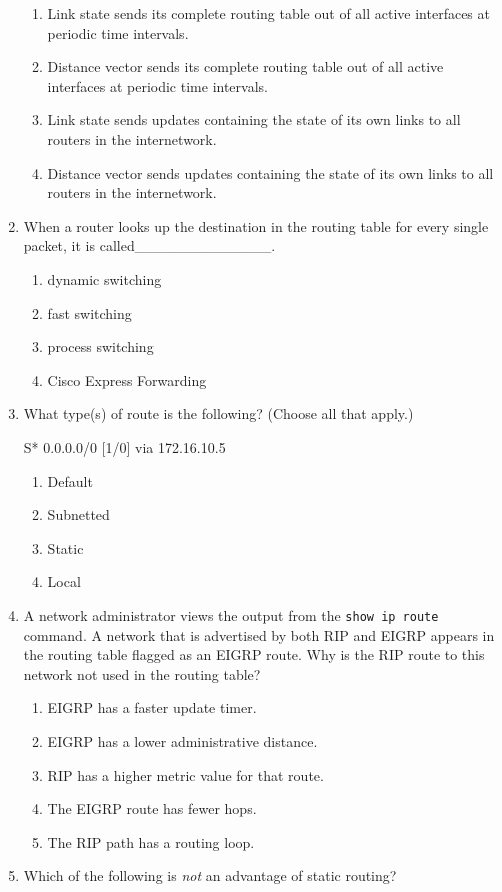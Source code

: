 \begin{enumerate}
  \begin{enumerate}
    \item
    Link state sends its complete routing table out of all active
    interfaces at periodic time intervals.
  \item
    Distance vector sends its complete routing table out of all active
    interfaces at periodic time intervals.
  \item
    Link state sends updates containing the state of its own links to
    all routers in the internetwork.
  \item
    Distance vector sends updates containing the state of its own links
    to all routers in the internetwork.
  \end{enumerate}
\item
  When a router looks up the destination in the routing table for every
  single packet, it is called\_\_\_\_\_\_\_\_\_\_\_\_\_.

  \begin{enumerate}
    \item
    dynamic switching
  \item
    fast switching
  \item
    process switching
  \item
    Cisco Express Forwarding
  \end{enumerate}
\item
  What type(s) of route is the following? (Choose all that apply.)

\begin{cli}
S*   0.0.0.0/0 [1/0] via 172.16.10.5
\end{cli}

  \begin{enumerate}
    \item
    Default
  \item
    Subnetted
  \item
    Static
  \item
    Local
  \end{enumerate}
\item
  A network administrator views the output from the
  \texttt{show\ ip\ route} command. A network that is advertised by both
  RIP and EIGRP appears in the routing table flagged as an EIGRP route.
  Why is the RIP route to this network not used in the routing table?

  \begin{enumerate}
    \item
    EIGRP has a faster update timer.
  \item
    EIGRP has a lower administrative distance.
  \item
    RIP has a higher metric value for that route.
  \item
    The EIGRP route has fewer hops.
  \item
    The RIP path has a routing loop.
  \end{enumerate}
\item
  Which of the following is \emph{not} an advantage of static routing?


\end{enumerate}

